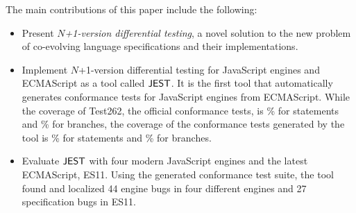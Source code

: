 The main contributions of this paper include the following:
\begin{itemize}
  \item Present \textit{$N$+1-version differential testing}, a novel solution to the new
    problem of co-evolving language specifications and their implementations.
  \item Implement $N$+1-version differential testing for JavaScript engines and
    ECMAScript as a tool called $\tool$. It is the first tool that automatically generates conformance
    tests for JavaScript engines from ECMAScript.  While the coverage
    of Test262, the official conformance tests, is \% for statements
    and \% for branches, the coverage of the conformance tests generated by the tool
    is \% for statements and \% for branches.
  \item Evaluate $\tool$ with four modern JavaScript engines and the latest
    ECMAScript, ES11.  Using the generated conformance test
    suite, the tool found and localized 44 engine bugs in four different
    engines and 27 specification bugs in ES11.
\end{itemize}
